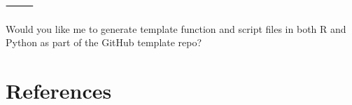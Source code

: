 \documentclass[
  letterpaper,
  DIV=11,
  numbers=noendperiod]{scrreprt}
\newlength{\cslhangindent}
\newenvironment{CSLReferences}[2] %
 {\begin{list}{}{%
  \setlength{\itemindent}{0pt}
  \setlength{\leftmargin}{0pt}
  \setlength{\parsep}{0pt}
  \ifodd #1
   \setlength{\leftmargin}{\cslhangindent}
   \setlength{\itemindent}{-1\cslhangindent}
  \fi
  \setlength{\itemsep}{#2\baselineskip}}}
 {\end{list}}
\begin{document}
⸻

Would you like me to generate template function and script files in both
R and Python as part of the GitHub template repo?


\chapter*{References}\label{references}


\label{refs}
\begin{CSLReferences}{0}{1}
\end{CSLReferences}
\end{document}
